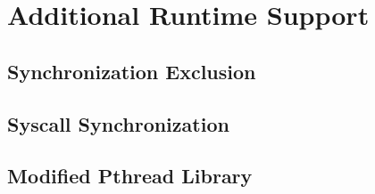 \chapter{Additional Runtime Support}
\section{Synchronization Exclusion}
\section{Syscall Synchronization}
\section{Modified Pthread Library}